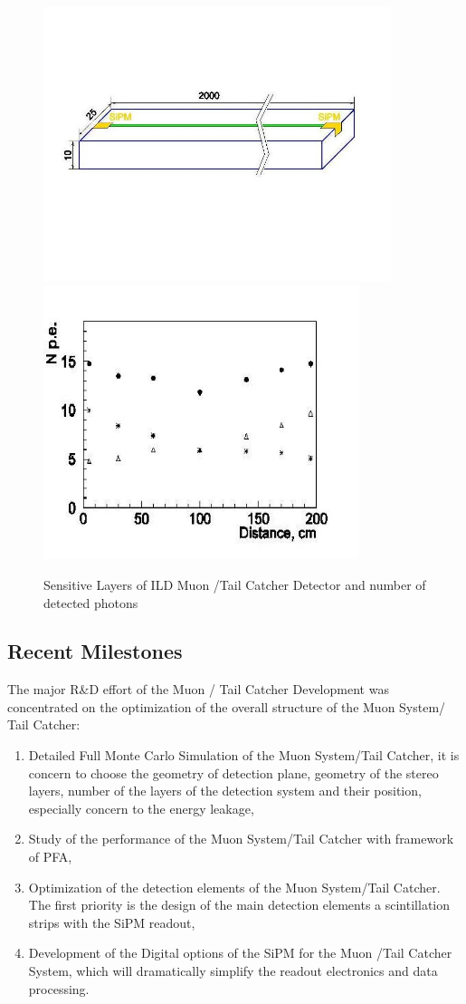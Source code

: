 \begin{figure}
	\centering
\includegraphics[height=8cm]{MuonDetector/MuonDetectorILD/Sc_strip.jpg}
\includegraphics[height=8cm]{MuonDetector/MuonDetectorILD/Sc_strip_photons.jpg}
	\caption{Sensitive Layers of ILD Muon /Tail Catcher Detector and number of detected photons}
	\label{fig:ild:muon:concept}
\end{figure}

\subsection{Recent Milestones}
The major R\&D effort of the Muon / Tail Catcher Development was concentrated on the optimization of the overall structure of the Muon System/ Tail Catcher:
\begin{enumerate}
\item Detailed Full Monte Carlo Simulation of the Muon System/Tail Catcher, it is concern to choose the geometry of detection plane, geometry of the stereo layers, number of the layers of the detection system and their position, especially concern to the energy leakage,
\item Study of the performance of the Muon System/Tail Catcher with framework of PFA,
\item Optimization of the detection elements of the Muon System/Tail Catcher. The first priority is the design of the main detection elements a scintillation strips with the SiPM readout,
\item Development of the Digital options of the SiPM for the Muon /Tail Catcher System, which will dramatically simplify the readout electronics and data processing.
\end{enumerate}

